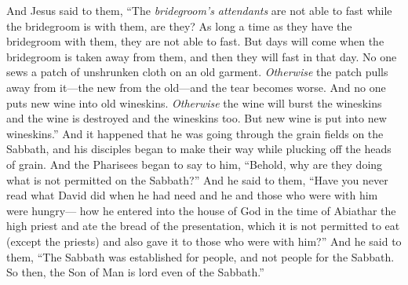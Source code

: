 \begin{biblechapter}
\verse And Jesus said to them, “The \textit{bridegroom’s attendants} are not able to fast while the bridegroom is with them, are they? As long a time as they have the bridegroom with them, they are not able to fast.
\verse But days will come when the bridegroom is taken away from them, and then they will fast in that day.
\verse No one sews a patch of unshrunken cloth on an old garment. \textit{Otherwise} the patch pulls away from it—the new from the old—and the tear becomes worse.
\verse And no one puts new wine into old wineskins. \textit{Otherwise} the wine will burst the wineskins and the wine is destroyed and the wineskins too. But new wine is put into new wineskins.”
 And it happened that he was going through the grain fields on the Sabbath, and his disciples began to make their way while plucking off the heads of grain.
\verse And the Pharisees began to say to him, “Behold, why are they doing what is not permitted on the Sabbath?”
\verse And he said to them, “Have you never read what David did when he had need and he and those who were with him were hungry—
\verse how he entered into the house of God in the time of Abiathar the high priest and ate the bread of the presentation, which it is not permitted to eat (except the priests) and also gave it to those who were with him?”
\verse And he said to them, “The Sabbath was established for people, and not people for the Sabbath.
\verse So then, the Son of Man is lord even of the Sabbath.”
\end{biblechapter}

